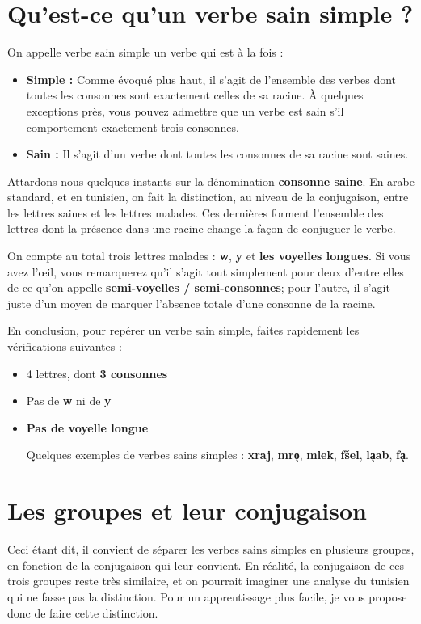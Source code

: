\section{Qu'est-ce qu'un verbe sain simple ?}
On appelle verbe sain simple un verbe qui est à la fois : 
\begin{itemize}
    \item \textbf{Simple :} Comme évoqué plus haut, il s'agit de l'ensemble des verbes dont toutes les consonnes sont exactement celles de sa racine. À quelques exceptions près, vous pouvez admettre que un verbe est sain s'il comportement exactement trois consonnes.
    \item \textbf{Sain :} Il s'agit d'un verbe dont toutes les consonnes de sa racine sont saines.
\end{itemize}

Attardons-nous quelques instants sur la dénomination \textbf{consonne saine}. En arabe standard, et en tunisien, on fait la distinction, au niveau de la conjugaison, entre les lettres saines et les lettres malades. Ces dernières forment l'ensemble des lettres dont la présence dans une racine change la façon de conjuguer le verbe. 

On compte au total trois lettres malades : \textbf{w}, \textbf{y} et \textbf{les voyelles longues}. Si vous avez l'\oe il, vous remarquerez qu'il s'agit tout simplement pour deux d'entre elles de ce qu'on appelle \textbf{semi-voyelles / semi-consonnes}; pour l'autre, il s'agit juste d'un moyen de marquer l'absence totale d'une consonne de la racine.

En conclusion, pour repérer un verbe sain simple, faites rapidement les vérifications suivantes :
\begin{itemize}
    \item 4 lettres, dont \textbf{3 consonnes}
    \item Pas de \textbf{w} ni de \textbf{y}
    \item \textbf{Pas de voyelle longue}

Quelques exemples de verbes sains simples : \textbf{xraj}, \textbf{mro\c{\dh}}, \textbf{mlek}, \textbf{f\v{s}el}, \textbf{l\c{a}ab}, \textbf{\textcrh fa\c{\dh}}.

\end{itemize}

\section{Les groupes et leur conjugaison}
Ceci étant dit, il convient de séparer les verbes sains simples en plusieurs groupes, en fonction de la conjugaison qui leur convient. En réalité, la conjugaison de ces trois groupes reste très similaire, et on pourrait imaginer une analyse du tunisien qui ne fasse pas la distinction. Pour un apprentissage plus facile, je vous propose donc de faire cette distinction.

